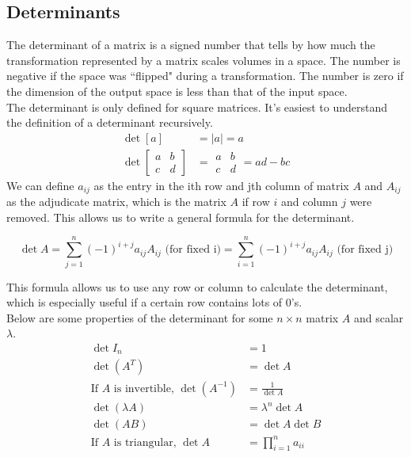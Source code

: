 \subsection{Determinants}
\noindent
The determinant of a matrix is a signed number that tells by how much the transformation represented by a matrix scales volumes in a space.
The number is negative if the space was ``flipped" during a transformation.
The number is zero if the dimension of the output space is less than that of the input space.\\

\noindent
The determinant is only defined for square matrices. It's easiest to understand the definition of a determinant recursively.
\begin{align*}
	\det{\left[ a \right]} &= \lvert a \rvert = a \\
	\det{\left[
		\begin{array}{cc}
			a & b \\
			c & d
		\end{array}
		\right]} &= \begin{array}{|cc|}
		a & b \\
		c & d
	\end{array} = ad - bc
\end{align*}
We can define $a_{ij}$ as the entry in the ith row and jth column of matrix $A$ and $A_{ij}$ as the adjudicate matrix, which is the matrix $A$ if row $i$ and column $j$ were removed. This allows us to write a general formula for the determinant.
\begin{definition}
	\begin{equation*}
		\det{A} = \sum_{j=1}^{n}{\left(-1\right)^{i+j}a_{ij}A_{ij}} \text{ (for fixed i)} = \sum_{i=1}^{n}{\left(-1\right)^{i+j}a_{ij}A_{ij}} \text{ (for fixed j)}
	\end{equation*}
\end{definition}
\noindent
This formula allows us to use any row or column to calculate the determinant, which is especially useful if a certain row contains lots of 0's.\\

\noindent
Below are some properties of the determinant for some $n \times n$ matrix $A$ and scalar $\lambda$.
\begin{align*}
	\det{I_n} &= 1 \\
	\det{(A^T)} &= \det{A} \\
	\text{If $A$ is invertible, } \det{(A^{-1})} &= \frac{1}{\det{A}} \\
	\det{(\lambda A)} &= \lambda^n\det{A} \\
	\det{(AB)} &= \det{A}\det{B} \\
	\text{If $A$ is triangular, } \det{A} &= \prod_{i=1}^{n}{a_{ii}}
\end{align*}

